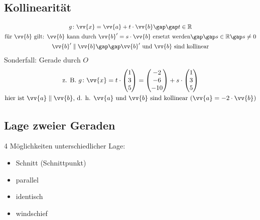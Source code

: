 \subsection{Kollinearität}
\begin{gather*}
  g \colon \vv{x} = \vv{a} + t \cdot \vv{b} \gap\gap t \in \mathbb{R} \\
  \text{für $\vv{b}$ gilt: $\vv{b}$ kann durch $\vv{b}' = s \cdot \vv{b}$ ersetzt werden} \gap\gap s \in \mathbb{R} \gap s \neq 0 \\
  \vv{b}' \parallel \vv{b} \gap\gap \text{$\vv{b}'$ und $\vv{b}$ sind kollinear}
\end{gather*}
Sonderfall: Gerade durch $O$
\begin{gather*}
  \text{z. B. } g \colon \vv{x} = t \cdot \begin{pmatrix}1 \\ 3 \\ 5\end{pmatrix} = \begin{pmatrix}-2 \\ -6 \\ -10\end{pmatrix} + s \cdot \begin{pmatrix}1 \\ 3 \\ 5\end{pmatrix} \\
  \text{hier ist $\vv{a} \parallel \vv{b}$, d. h. $\vv{a}$ und $\vv{b}$ sind kollinear ($\vv{a} = -2 \cdot \vv{b}$)}
\end{gather*}
\subsection{Lage zweier Geraden}
4 Möglichkeiten unterschiedlicher Lage:
\begin{itemize}
  \item Schnitt (Schnittpunkt)
  \item parallel
  \item identisch
  \item windschief
\end{itemize}

